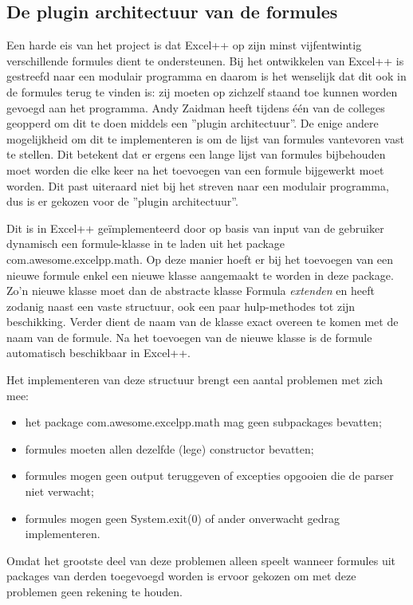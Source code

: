 \documentclass[a4paper,11pt,titlepage]{scrartcl}
\begin{document}
\subsection{De plugin architectuur van de formules}
Een harde eis van het project is dat Excel++ op zijn minst vijfentwintig verschillende formules dient te ondersteunen. Bij het ontwikkelen van Excel++ is gestreefd naar een modulair programma en daarom is het wenselijk dat dit ook in de formules terug te vinden is: zij moeten op zichzelf staand toe kunnen worden gevoegd aan het programma. Andy Zaidman heeft tijdens één van de colleges geopperd om dit te doen middels een ''plugin architectuur''. De enige andere mogelijkheid om dit te implementeren is om de lijst van formules vantevoren vast te stellen. Dit betekent dat er ergens een lange lijst van formules bijbehouden moet worden die elke keer na het toevoegen van een formule bijgewerkt moet worden. Dit past uiteraard niet bij het streven naar een modulair programma, dus is er gekozen voor de ''plugin architectuur''.

Dit is in Excel++ geïmplementeerd door op basis van input van de gebruiker dynamisch een formule-klasse in te laden uit het package com.awesome.excelpp.math. Op deze manier hoeft er bij het toevoegen van een nieuwe formule enkel een nieuwe klasse aangemaakt te worden in deze package. Zo'n nieuwe klasse moet dan de abstracte klasse Formula \textit{extenden} en heeft zodanig naast een vaste structuur, ook een paar hulp-methodes tot zijn beschikking. Verder dient de naam van de klasse exact overeen te komen met de naam van de formule. Na het toevoegen van de nieuwe klasse is de formule automatisch beschikbaar in Excel++.

\newpage Het implementeren van deze structuur brengt een aantal problemen met zich mee:
\begin{itemize}
	\item het package com.awesome.excelpp.math mag geen subpackages bevatten;
	\item formules moeten allen dezelfde (lege) constructor bevatten;
	\item formules mogen geen output teruggeven of excepties opgooien die de parser niet verwacht;
	\item formules mogen geen System.exit(0) of ander onverwacht gedrag implementeren.
\end{itemize}
Omdat het grootste deel van deze problemen alleen speelt wanneer formules uit packages van derden toegevoegd worden is ervoor gekozen om met deze problemen geen rekening te houden.
\end{document}

